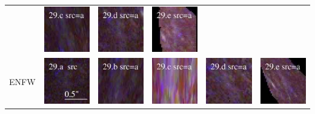 \documentclass[useAMS,usenatbib]{mn2e}
\begin{document}
\begin{table}
\begin{tabular}{cccccc}
    & \multicolumn{1}{m{1.7cm}}{\includegraphics[height=2.00cm,clip]{figs/nsie_img/rgb.pre_29_c_a_tri.ps}}
    & \multicolumn{1}{m{1.7cm}}{\includegraphics[height=2.00cm,clip]{figs/nsie_img/rgb.pre_29_d_a_tri.ps}}
    & \multicolumn{1}{m{1.7cm}}{\includegraphics[height=2.00cm,clip]{figs/nsie_img/rgb.pre_29_e_a_tri.ps}} \\
    \multicolumn{1}{m{1cm}}{{\Large ENFW}}
    & \multicolumn{1}{m{1.7cm}}{\includegraphics[height=2.00cm,clip]{figs/enfw_img/rgb.src_29_a.ps}}
    & \multicolumn{1}{m{1.7cm}}{\includegraphics[height=2.00cm,clip]{figs/enfw_img/rgb.pre_29_b_a_tri.ps}}
    & \multicolumn{1}{m{1.7cm}}{\includegraphics[height=2.00cm,clip]{figs/enfw_img/rgb.pre_29_c_a_tri.ps}}
    & \multicolumn{1}{m{1.7cm}}{\includegraphics[height=2.00cm,clip]{figs/enfw_img/rgb.pre_29_d_a_tri.ps}}
    & \multicolumn{1}{m{1.7cm}}{\includegraphics[height=2.00cm,clip]{figs/enfw_img/rgb.pre_29_e_a_tri.ps}} \\
  \end{tabular}

\end{table}
\end{document}
